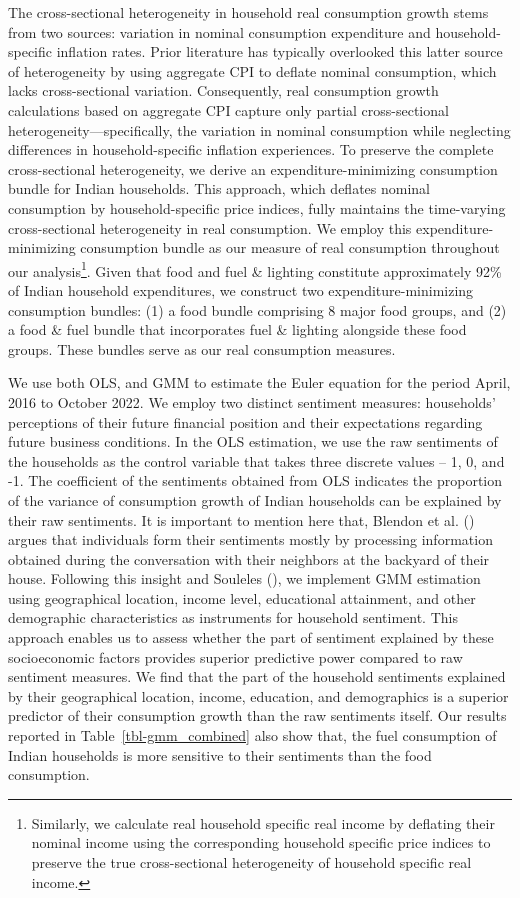 \documentclass[
  abstract]{scrartcl}
\begin{document}
The cross-sectional heterogeneity in household real consumption growth
stems from two sources: variation in nominal consumption expenditure and
household-specific inflation rates. Prior literature has typically
overlooked this latter source of heterogeneity by using aggregate CPI to
deflate nominal consumption, which lacks cross-sectional variation.
Consequently, real consumption growth calculations based on aggregate
CPI capture only partial cross-sectional heterogeneity---specifically,
the variation in nominal consumption while neglecting differences in
household-specific inflation experiences. To preserve the complete
cross-sectional heterogeneity, we derive an expenditure-minimizing
consumption bundle for Indian households. This approach, which deflates
nominal consumption by household-specific price indices, fully maintains
the time-varying cross-sectional heterogeneity in real consumption. We
employ this expenditure-minimizing consumption bundle as our measure of
real consumption throughout our analysis\footnote{Similarly, we
  calculate real household specific real income by deflating their
  nominal income using the corresponding household specific price
  indices to preserve the true cross-sectional heterogeneity of
  household specific real income.}. Given that food and fuel \& lighting
constitute approximately 92\% of Indian household expenditures, we
construct two expenditure-minimizing consumption bundles: (1) a food
bundle comprising 8 major food groups, and (2) a food \& fuel bundle
that incorporates fuel \& lighting alongside these food groups. These
bundles serve as our real consumption measures.

We use both OLS, and GMM to estimate the Euler equation for the period
April, 2016 to October 2022. We employ two distinct sentiment measures:
households' perceptions of their future financial position and their
expectations regarding future business conditions. In the OLS
estimation, we use the raw sentiments of the households as the control
variable that takes three discrete values -- 1, 0, and -1. The
coefficient of the sentiments obtained from OLS indicates the proportion
of the variance of consumption growth of Indian households can be
explained by their raw sentiments. It is important to mention here that,
Blendon et al. () argues that
individuals form their sentiments mostly by processing information
obtained during the conversation with their neighbors at the backyard of
their house. Following this insight and Souleles
(), we implement GMM
estimation using geographical location, income level, educational
attainment, and other demographic characteristics as instruments for
household sentiment. This approach enables us to assess whether the part
of sentiment explained by these socioeconomic factors provides superior
predictive power compared to raw sentiment measures. We find that the
part of the household sentiments explained by their geographical
location, income, education, and demographics is a superior predictor of
their consumption growth than the raw sentiments itself. Our results
reported in {Table~\ref{tbl-gmm_combined}} also show that, the fuel
consumption of Indian households is more sensitive to their sentiments
than the food consumption.
\end{document}
